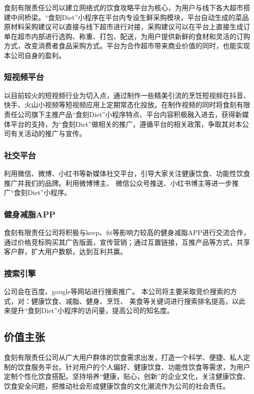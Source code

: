 \documentclass[UTF8,12pt]{ctexart}
\numberwithin{figure}{section}%
\begin{document}
\begin{spacing}{2}
食刻有限责任公司以建立网络式的饮食攻略平台为核心，为用户与线下各大超市搭建中间桥梁。“食刻Diet”小程序在平台内专设生鲜采购模块，平台自动生成的菜品原材料采购建议可以直接与线下超市进行对接，采购建议可以在平台上直接生成订单在超市内部进行选购、称重、打包、配送，为用户提供新鲜的食材和灵活的订购方式，改变消费者食品采购方式。平台为合作超市带来商业价值的同时，也能实现本公司自身的盈利。


\subsubsection{短视频平台}

以目前较火的短视频行业为切入点，通过制作一些精美引流的烹饪短视频在抖音、快手、火山小视频等短视频应用上定期常态化投放。在制作视频的同时将食刻有限责任公司旗下主推产品“食刻Diet”小程序特点、平台内容积极融入进去，获得新媒体平台的支持，为“食刻Diet”做相关的推广，遵循平台的相关政策，争取其对本公司有关活动的推广与宣传。

\subsubsection{社交平台}

利用微信、微博、小红书等新媒体社交平台，引导大家关注健康饮食、功能性饮食推广并我们的品牌。利用微博博主、 微信公众号推送、小红书博主等进一步推广“食刻Diet”小程序。

\subsubsection{健身减脂APP}

食刻有限责任公司将积极与keep、fit等影响力较高的健身减脂APP进行交流合作，通过价格竞标购买其广告版面，宣传营销；通过互置链接，互推产品等方式，共享客户群，扩大用户数额，达到互利共赢。

\subsubsection{搜索引擎}

公司会在百度、google等网站进行搜索推广。 本公司将主要采取竞价搜索的方式，对：健康饮食、减脂、健身、烹饪、 美食等关键词进行搜索排名提高，以此来提升“食刻Diet”小程序的访问量，提高公司的知名度。

\subsection{价值主张}

食刻有限责任公司从广大用户群体的饮食需求出发，打造一个科学、便捷、私人定制的饮食服务平台。针对用户的个人偏好、健康饮食、功能性饮食等需求，为用户定制个性化饮食搭配。坚持培养“健康，贴心，创新”的企业文化，关注健康饮食、饮食安全问题，把推动社会形成健康饮食的文化潮流作为公司的社会责任。


\end{spacing}
\end{document}
